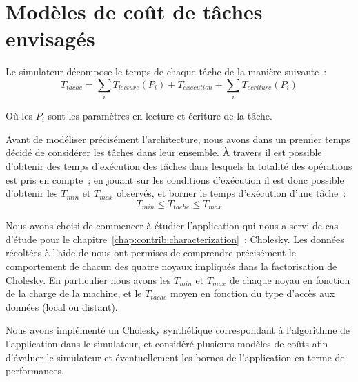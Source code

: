 \section{Modèles de coût de tâches envisagés}\label{sec:simulation:modeles}

Le simulateur décompose le temps de chaque tâche de la manière suivante~:
$$
T_{tache} = \sum_{i} T_{lecture}(P_i) + T_{execution} + \sum_{i} T_{ecriture}(P_i)
$$

Où les $P_i$ sont les paramètres en lecture et écriture de la tâche.

Avant de modéliser précisément l'architecture, nous avons dans un premier temps décidé de considérer les tâches dans leur ensemble.
À travers \outil il est possible d'obtenir des temps d'exécution des tâches dans lesquels la totalité des opérations est pris en compte~; en jouant sur les conditions d'exécution il est donc possible d'obtenir les $T_{min}$ et $T_{max}$ observés, et borner le temps d'exécution d'une tâche~:
$$
T_{min} \leq T_{tache} \leq T_{max}
$$


Nous avons choisi de commencer à étudier l'application qui nous a servi de cas d'étude pour le chapitre~\ref{chap:contrib:characterization}~: Cholesky.
Les données récoltées à l'aide de \outil nous ont permises de comprendre précisément le comportement de chacun des quatre noyaux impliqués dans la factorisation de Cholesky.
En particulier nous avons les $T_{min}$ et $T_{max}$ de chaque noyau en fonction de la charge de la machine, et le $T_{tache}$ moyen en fonction du type d'accès aux données (local ou distant).

Nous avons implémenté un Cholesky synthétique correspondant à l'algorithme de l'application dans le simulateur, et considéré plusieurs modèles de coûts afin d'évaluer le simulateur et éventuellement les bornes de l'application en terme de performances.

